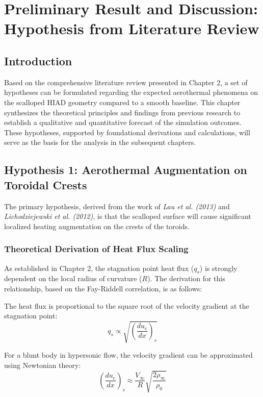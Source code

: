 \chapter{Preliminary Result and Discussion: Hypothesis from Literature Review}

\section{Introduction}
Based on the comprehensive literature review presented in Chapter 2, a set of hypotheses can be formulated regarding the expected aerothermal phenomena on the scalloped HIAD geometry compared to a smooth baseline. This chapter synthesizes the theoretical principles and findings from previous research to establish a qualitative and quantitative forecast of the simulation outcomes. These hypotheses, supported by foundational derivations and calculations, will serve as the basis for the analysis in the subsequent chapters.

\section{Hypothesis 1: Aerothermal Augmentation on Toroidal Crests}
The primary hypothesis, derived from the work of \textit{Lau et al. (2013)} and \textit{Lichodziejewski et al. (2012)}, is that the scalloped surface will cause significant localized heating augmentation on the crests of the toroids.

\subsection{Theoretical Derivation of Heat Flux Scaling}
As established in Chapter 2, the stagnation point heat flux ($q_s$) is strongly dependent on the local radius of curvature ($R$). The derivation for this relationship, based on the Fay-Riddell correlation, is as follows:

The heat flux is proportional to the square root of the velocity gradient at the stagnation point:
\begin{equation}
    q_s \propto \sqrt{\left( \frac{du_e}{dx} \right)_s}
\end{equation}

For a blunt body in hypersonic flow, the velocity gradient can be approximated using Newtonian theory:
\begin{equation}
    \left( \frac{du_e}{dx} \right)_s \approx \frac{V_{\infty}}{R} \sqrt{\frac{2 \rho_{\infty}}{\rho_{0}}}
\end{equation}


